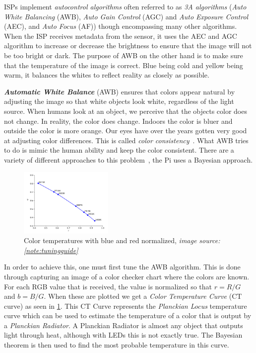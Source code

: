 ISPs implement \textit{autocontrol algorithms} often referred to as \textit{3A algorithms} (\textit{Auto
White Balancing} (AWB), \textit{Auto Gain Control} (AGC) and \textit{Auto
Exposure Control} (AEC), and \textit{Auto Focus} (AF)) though encompassing many
other algorithms. When the ISP receives metadata from the sensor, it uses the
AEC and AGC algorithm to increase or decrease the brightness to ensure that the
image will not be too bright or dark. The purpose of AWB on the other hand is
to make sure that the temperature of the image is correct. Blue being cold and
yellow being warm, it balances the whites to reflect reality as closely as
possible.

\textit{\textbf{Automatic White Balance}} (AWB) ensures that colors appear
natural by adjusting the image so that white objects look white, regardless of
the light source. When humans look at an object, we perceive that the objects color
does not change. In reality, the color does change. Indoors the color
is bluer and outside the color is more orange. Our eyes have over the years
gotten very good at adjusting color differences. This is called \textit{color
consistency}~\cite{foster2011color, ebner2021color}. What AWB tries to do is
mimic the human ability and keep the color consistent. There are a variety of
different approaches to this problem~\cite{agarwal2006overview}, the Pi uses a
Bayesian approach.

\begin{figure}
    \begin{center}
        \includegraphics[width=0.4\textwidth]{figures/temperature.png}
    \end{center}
    \caption{Color temperatures with blue and red normalized, \textit{image source: \cref{note:tuningguide}}}\label{fig:temperatures}
\end{figure}
In order to achieve this, one must first tune the AWB algorithm. This is done
through capturing an image of a color checker chart where the colors are known.
For each RGB value that is received, the value is normalized so that $r = R /
G$ and $b = B / G$. When these are plotted we get a \textit{Color Temperature
Curve} (CT curve) as seen in \cref{fig:temperatures}. This CT Curve
represents the \textit{Planckian Locus} temperature curve which can be used to
estimate the temperature of a color that is output by a \textit{Planckian
Radiator}\cite{international1957international}. A Planckian Radiator is almost
any object that outputs light through heat, although with LEDs this is not
exactly true. The Bayesian theorem is then used to find the most probable
temperature in this curve.

